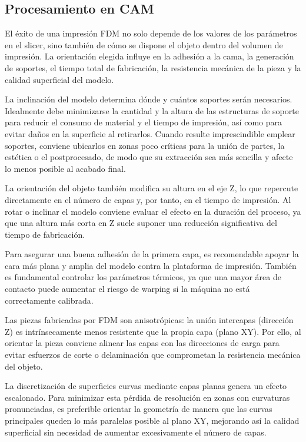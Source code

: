 \subsection{Procesamiento en CAM}

El éxito de una impresión FDM no solo depende de los valores de los parámetros en el slicer, sino también de cómo se dispone el objeto dentro del volumen de impresión. La orientación elegida influye en la adhesión a la cama, la generación de soportes, el tiempo total de fabricación, la resistencia mecánica de la pieza y la calidad superficial del modelo.

La inclinación del modelo determina dónde y cuántos soportes serán necesarios. Idealmente debe minimizarse la cantidad y la altura de las estructuras de soporte para reducir el consumo de material y el tiempo de impresión, así como para evitar daños en la superficie al retirarlos. Cuando resulte imprescindible emplear soportes, conviene ubicarlos en zonas poco críticas para la unión de partes, la estética o el postprocesado, de modo que su extracción sea más sencilla y afecte lo menos posible al acabado final.

La orientación del objeto también modifica su altura en el eje Z, lo que repercute directamente en el número de capas y, por tanto, en el tiempo de impresión. Al rotar o inclinar el modelo conviene evaluar el efecto en la duración del proceso, ya que una altura más corta en Z suele suponer una reducción significativa del tiempo de fabricación.

Para asegurar una buena adhesión de la primera capa, es recomendable apoyar la cara más plana y amplia del modelo contra la plataforma de impresión. También es fundamental controlar los parámetros térmicos, ya que una mayor área de contacto puede aumentar el riesgo de warping si la máquina no está correctamente calibrada.

Las piezas fabricadas por FDM son anisotrópicas: la unión intercapas (dirección Z) es intrínsecamente menos resistente que la propia capa (plano XY). Por ello, al orientar la pieza conviene alinear las capas con las direcciones de carga para evitar esfuerzos de corte o delaminación que comprometan la resistencia mecánica del objeto.

La discretización de superficies curvas mediante capas planas genera un efecto escalonado. Para minimizar esta pérdida de resolución en zonas con curvaturas pronunciadas, es preferible orientar la geometría de manera que las curvas principales queden lo más paralelas posible al plano XY, mejorando así la calidad superficial sin necesidad de aumentar excesivamente el número de capas.

